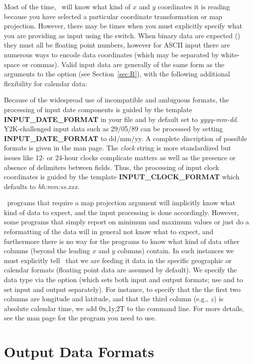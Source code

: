Most of the time, \GMT\ will know what kind of $x$ and $y$ coordinates it is reading because you have selected
a particular coordinate transformation or map projection.  However,
there may be times when you must explicitly specify what you are
providing as input using the  switch. When binary data are expected () they must all
be floating point numbers, however for ASCII input there are numerous
ways to encode data coordinates (which may be separated by white-space or commas).  Valid input data are generally
of the same form as the arguments to the  option (see Section~\ref{sec:R}), with the following additional
flexibility for calendar data:

Because of the widespread use of incompatible and ambiguous formats, the processing of input
date components is guided by the template {\bf INPUT\_DATE\_FORMAT} in your
 file and by default set to {\it yyyy-mm-dd}.  Y2K-challenged input data such as 29/05/89 can be processed by setting {\bf INPUT\_DATE\_FORMAT}
to dd/mm/yy.  A complete discription of possible formats is given in the 
man page.  The {\it clock} string is more standardized but issues like 12- or 24-hour clocks complicate matters
as well as the presence or absence of delimiters between fields.  Thus, the processing of input
clock coordinates is guided by the template {\bf INPUT\_CLOCK\_FORMAT} which defaults to {\it hh:mm:ss.xxx}.

\GMT\ programs that require a map projection argument will implicitly know what kind of data to expect, and the
input processing is done accordingly.  However, some programs that simply report on minimum and maximum
values or just do a reformatting of the data will in general not know what to expect, and furthermore there is
no way for the programs to know what kind of data other columns (beyond the leading $x$ and $y$ columns) contain.
In such instances we must
explicitly tell \GMT\ that we are feeding it data in the specific geographic or calendar formats (floating point
data are assumed by default).  We specify the data type via the  option (which sets both input and output
formats; use  and  to set input and output separately).  For instance, to specify that the
the first two columns are longitude and latitude, and that the third column (e.g., $z$) is absolute calendar time, we add
0x,1y,2T to the command line.  For more details, see the man page for the program you need to use.

\section{Output Data Formats}

